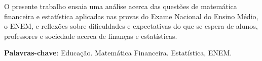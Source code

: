 
\setlength{\absparsep}{18pt} %
\begin{resumo}
 O presente trabalho ensaia uma análise acerca das questões de matemática financeira e estatística aplicadas nas provas do Exame Nacional do Ensino Médio, o ENEM, e reflexões sobre dificuldades e expectativas do que se espera de alunos, professores e sociedade acerca de finanças e estatísticas. 

 \textbf{Palavras-chave}: Educação. Matemática Financeira. Estatística, ENEM.
\end{resumo}
